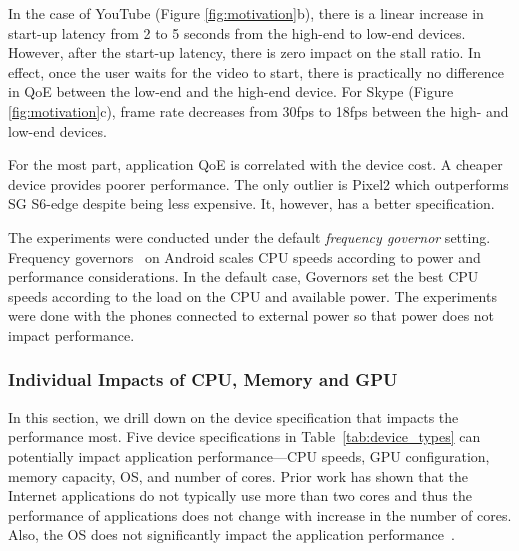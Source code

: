 In the case of YouTube (Figure \ref{fig:motivation}b), there is a linear increase 
in start-up latency from 2 to 5 seconds from the high-end to low-end devices. However, after the start-up latency, there is zero impact on the stall ratio. In effect, once the user waits for the video to start, there is practically no difference in QoE between the low-end and the high-end device. For Skype (Figure \ref{fig:motivation}c), frame rate decreases from 30fps to 18fps between the high- and low-end devices.

For the most part, application QoE is correlated with the device cost.  A
cheaper device provides poorer performance. The only outlier is Pixel2 
which outperforms SG S6-edge despite being less expensive. It, however,
has a better specification. 

The experiments were conducted under the default {\em frequency governor} setting. 
Frequency governors~\cite{ad-governors} on 
Android scales CPU speeds according to power and performance considerations. In the default case, 
Governors set the best CPU speeds according to the load on the CPU and available power. 
The experiments were done with the phones connected to external power so that
power does not impact performance. 




\subsubsection{Individual Impacts of CPU, Memory and GPU}
\label{sec:impact_cpu}
In this section, we drill down on the device specification that impacts the performance most. Five device specifications in Table~\ref{tab:device_types} can potentially impact application performance---CPU speeds, GPU configuration, memory capacity, OS, and number of cores. Prior work \cite{gao2015study,blake2010evolution} 
has shown that the Internet applications do not typically 
use more than two cores and thus the performance of applications does not change with increase in the number of cores. Also, the OS  does not significantly impact the application performance~\cite{corral2016preserving}. %

